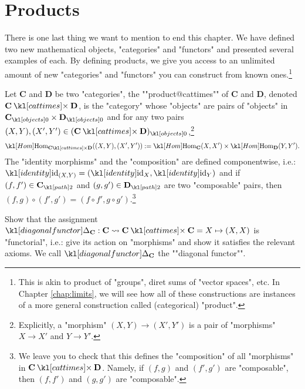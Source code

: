 \documentclass[main.tex]{subfiles}
\begin{document}
\section{Products}
There is one last thing we want to mention to end this chapter. We have defined two new mathematical objects, "categories" and "functors" and presented several examples of each. By defining products, we give you access to an unlimited amount of new "categories" and "functors" you can construct from known ones.\footnote{This is akin to product of "groups", diret sums of "vector spaces", etc. In Chapter \ref{chap:limits}, we will see how all of these constructions are instances of a more general construction called (categorical) "product".}
\begin{defn}\label{defn:prodcat}
	\AP Let $\mathbf{C}$ and $\mathbf{D}$ be two "categories", the ""product@cattimes"" of $\mathbf{C}$ and $\mathbf{D}$, denoted $\mathbf{C} \cattimes \mathbf{D}$, is the "category" whose "objects" are pairs of "objects" in $\obj{\mathbf{C}}\times \obj{\mathbf{D}}$ and for any two pairs $(X,Y), (X',Y') \in \obj{(\mathbf{C}\cattimes \mathbf{D})}$,\footnote{Explicitly, a "morphism" $(X,Y) \rightarrow (X',Y')$ is a pair of "morphisms" $X \rightarrow X'$ and $Y \rightarrow Y'$.}
	\[\Hom_{\mathbf{C}\cattimes \mathbf{D}}((X,Y),(X',Y')) := \Hom_{\mathbf{C}}(X,X')\times \Hom_{\mathbf{D}}(Y,Y').\]
	The "identity morphisms" and the "composition" are defined componentwise, i.e.: $\id_{(X,Y)} = (\id_X,\id_Y)$ and if $(f,f')\in \mortwo{\mathbf{C}}$ and $(g,g') \in \mortwo{\mathbf{D}}$ are two "composable" pairs, then $(f,g) \circ (f',g') = (f\circ f', g \circ g')$.\footnote{We leave you to check that this defines the "composition" of all "morphisms" in $\mathbf{C} \cattimes \mathbf{D}$. Namely, if $(f,g)$ and $(f',g')$ are "composable", then $(f,f')$ and $(g,g')$ are "composable".}
\end{defn}
\begin{exer}\label{exer:catfunc:diagfunc}
	Show that the assignment $\diagFunc_{\mathbf{C}} :\mathbf{C} \rightsquigarrow \mathbf{C}\cattimes \mathbf{C} = X \mapsto (X,X)$ is "functorial", i.e.: give its action on "morphisms" and show it satisfies the relevant axioms. We call $\diagFunc_{\mathbf{C}}$ the ""diagonal functor"".
\end{exer}
\end{document}

